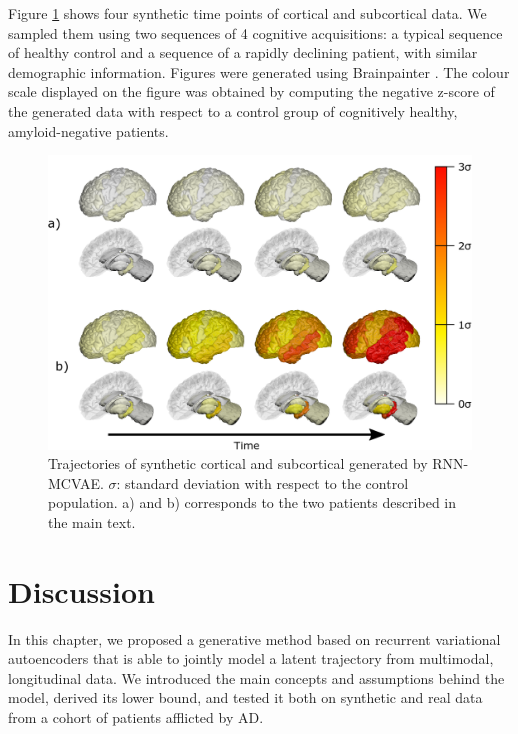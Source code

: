 Figure \ref{fig:rnn:qualitative} shows four synthetic time points of cortical and subcortical data. We sampled them using two sequences of 4 cognitive acquisitions: a typical sequence of healthy control and a sequence of a rapidly declining patient, with similar demographic information. Figures were generated using Brainpainter \cite{Marinescu2019a}. The colour scale displayed on the figure was obtained by computing the negative z-score of the generated data with respect to a control group of cognitively healthy, amyloid-negative \cite{Shaw2009} patients. \\

\begin{figure}[!htbp]
  \centering
  \includegraphics[width=1.0\textwidth]{figures/rnnvae/brainpainter.png}
  \caption[Trajectories of synthetic cortical and subcortical generated by RNN-MCVAE.]{Trajectories of synthetic cortical and subcortical generated by RNN-MCVAE. $\sigma$: standard deviation with respect to the control population. a) and b) corresponds to the two patients described in the main text.}
 \label{fig:rnn:qualitative}
\end{figure}

\section{Discussion}
\label{rnn:discussion}

In this chapter, we proposed a generative method based on recurrent variational autoencoders that is able to jointly model a latent trajectory from multimodal, longitudinal data. We introduced the main concepts and assumptions behind the model, derived its lower bound, and tested it both on synthetic and real data from a cohort of patients afflicted by AD. \\

